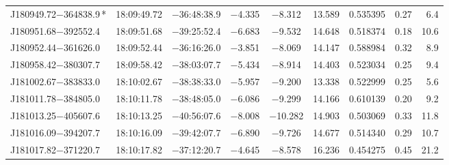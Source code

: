 \begin{table*}
\begin{tabular}{lcccccccr}
J180949.72$-$364838.9\,* & 18:09:49.72 & $-$36:48:38.9 & $-$4.335 & $-$8.312 & 13.589 & 0.535395 & 0.27 & 6.4 \\
J180951.68$-$392552.4 & 18:09:51.68 & $-$39:25:52.4 & $-$6.683 & $-$9.532 & 14.648 & 0.518374 & 0.18 & 10.6 \\
J180952.44$-$361626.0 & 18:09:52.44 & $-$36:16:26.0 & $-$3.851 & $-$8.069 & 14.147 & 0.588984 & 0.32 & 8.9 \\
J180958.42$-$380307.7 & 18:09:58.42 & $-$38:03:07.7 & $-$5.434 & $-$8.914 & 14.403 & 0.523034 & 0.25 & 9.4 \\
J181002.67$-$383833.0 & 18:10:02.67 & $-$38:38:33.0 & $-$5.957 & $-$9.200 & 13.338 & 0.522999 & 0.25 & 5.6 \\
J181011.78$-$384805.0 & 18:10:11.78 & $-$38:48:05.0 & $-$6.086 & $-$9.299 & 14.166 & 0.610139 & 0.20 & 9.2 \\
J181013.25$-$405607.6 & 18:10:13.25 & $-$40:56:07.6 & $-$8.008 & $-$10.282 & 14.903 & 0.503069 & 0.33 & 11.8 \\
J181016.09$-$394207.7 & 18:10:16.09 & $-$39:42:07.7 & $-$6.890 & $-$9.726 & 14.677 & 0.514340 & 0.29 & 10.7 \\
J181017.82$-$371220.7 & 18:10:17.82 & $-$37:12:20.7 & $-$4.645 & $-$8.578 & 16.236 & 0.454275 & 0.45 & 21.2 \\
\hline
\end{tabular}
\end{table*}

\addtocounter{table}{-1}


